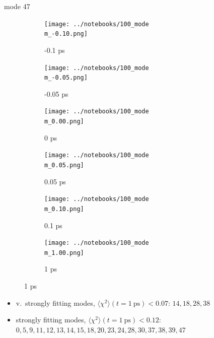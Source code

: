 \documentclass{beamer}
\begin{document}
\renewcommand\m{47}
\begin{frame}{mode \m}
	\begin{figure}
		\centering
		\begin{subfigure}[b]{\w\textwidth}
			\centering
			\texttt{[image: ../notebooks/100\_mode\\m\_-0.10.png]}
			\caption{-0.1 ps}
		\end{subfigure}
		\begin{subfigure}[b]{\w\textwidth}
			\centering
			\texttt{[image: ../notebooks/100\_mode\\m\_-0.05.png]}
			\caption{-0.05 ps}
		\end{subfigure}
		\begin{subfigure}[b]{\w\textwidth}
			\centering
			\texttt{[image: ../notebooks/100\_mode\\m\_0.00.png]}
			\caption{0 ps}
		\end{subfigure}
		\begin{subfigure}[b]{\w\textwidth}
			\centering
			\texttt{[image: ../notebooks/100\_mode\\m\_0.05.png]}
			\caption{0.05 ps}
		\end{subfigure}
		\begin{subfigure}[b]{\w\textwidth}
			\centering
			\texttt{[image: ../notebooks/100\_mode\\m\_0.10.png]}
			\caption{0.1 ps}
		\end{subfigure}
		\begin{subfigure}[b]{\w\textwidth}
			\centering
			\texttt{[image: ../notebooks/100\_mode\\m\_1.00.png]}
			\caption{1 ps}
		\end{subfigure}
	\end{figure}
\end{frame}

\fi %

\begin{frame}
	\begin{itemize}
		\item v.\ strongly fitting modes, $\langle\chi^2\rangle(t = 1\ \textrm{ps}) < 0.07$: $14,18,28,38$
		\item strongly fitting modes, $\langle\chi^2\rangle(t = 1\ \textrm{ps}) < 0.12$: $0,5,9,11,12,13,14,15,18,20,23,24,28,30,37,38,39,47$
	\end{itemize}
\end{frame}
\end{document}
